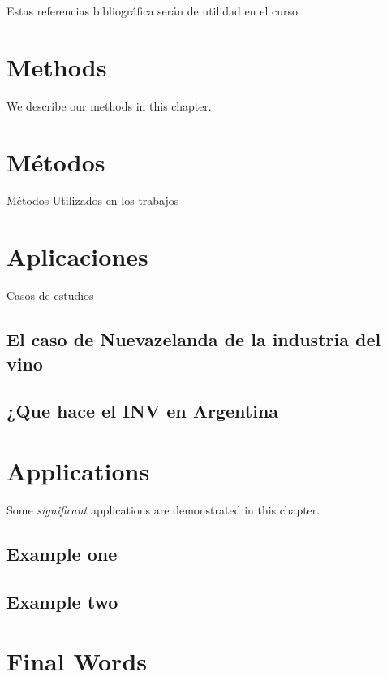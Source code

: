 \documentclass[]{article}
\begin{document}
Estas referencias bibliográfica serán de utilidad en el curso

\section{Methods}\label{methods}

We describe our methods in this chapter.

\section{Métodos}\label{muxe9todos}

Métodos Utilizados en los trabajos

\section{Aplicaciones}\label{aplicaciones}

Casos de estudios

\subsection{El caso de Nuevazelanda de la industria del
vino}\label{el-caso-de-nuevazelanda-de-la-industria-del-vino}

\subsection{¿Que hace el INV en
Argentina}\label{que-hace-el-inv-en-argentina}

\section{Applications}\label{applications}

Some \emph{significant} applications are demonstrated in this chapter.

\subsection{Example one}\label{example-one}

\subsection{Example two}\label{example-two}

\section{Final Words}\label{final-words}
\end{document}
